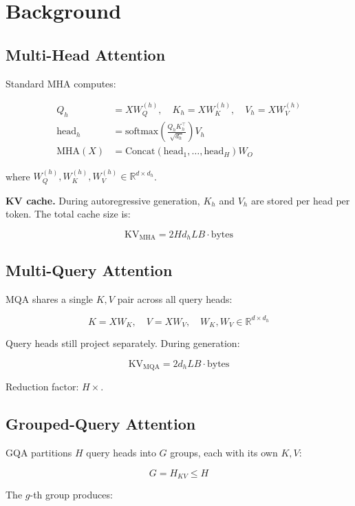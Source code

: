 
\section{Background}

\subsection{Multi-Head Attention}

Standard MHA computes:

\[
\begin{aligned}
Q_h &= X W_Q^{(h)}, \quad K_h = X W_K^{(h)}, \quad V_h = X W_V^{(h)} \\
\text{head}_h &= \text{softmax}\!\left(\frac{Q_h K_h^\top}{\sqrt{d_h}}\right) V_h \\
\text{MHA}(X) &= \text{Concat}(\text{head}_1, \dots, \text{head}_H) W_O
\end{aligned}
\tag{3.1}
\]

where $W_Q^{(h)}, W_K^{(h)}, W_V^{(h)} \in \mathbb{R}^{d \times d_h}$.

\textbf{KV cache.} During autoregressive generation, $K_h$ and $V_h$ are stored 
per head per token. The total cache size is:

\[
\text{KV}_\text{MHA} = 2 H d_h L B \cdot \text{bytes}
\tag{3.2}
\]

\subsection{Multi-Query Attention}

MQA shares a single $K, V$ pair across all query heads:

\[
K = X W_K, \quad V = X W_V, \quad W_K, W_V \in \mathbb{R}^{d \times d_h}
\tag{3.3}
\]

Query heads still project separately. During generation:

\[
\text{KV}_\text{MQA} = 2 d_h L B \cdot \text{bytes}
\tag{3.4}
\]

Reduction factor: $H\times$.

\subsection{Grouped-Query Attention}

GQA partitions $H$ query heads into $G$ groups, each with its own $K, V$:

\[
G = H_{KV} \le H
\tag{3.5}
\]

The $g$-th group produces:

